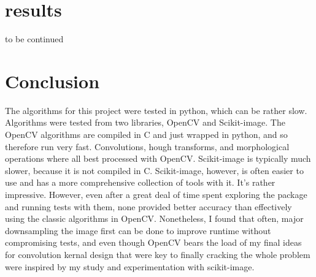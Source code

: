 \documentclass{article}
\begin{document}
        \section{results}
         to be continued
        \section{Conclusion}

            The algorithms for this project were tested in python, which can be rather slow. Algorithms were tested from two libraries, OpenCV and Scikit-image. The OpenCV algorithms are compiled in C and just wrapped in python, and so therefore run very fast. 
            Convolutions,  hough transforms, and morphological operations where all best processed with OpenCV. Scikit-image is typically much slower, because it is not compiled in C. Scikit-image, however, is often easier to use and has a more comprehensive collection of tools with it. It's rather impressive. However,
            even after a great deal of time spent exploring the package and running tests with them, none provided better accuracy than effectively using the classic algorithms in OpenCV.
            Nonetheless, I found that often, major downsampling the image first can be done to improve runtime without compromising tests, and even though OpenCV bears the load of my final  ideas for convolution kernal design that were key to finally cracking the whole problem were inspired by my study and experimentation with scikit-image.
    
\end{document}
